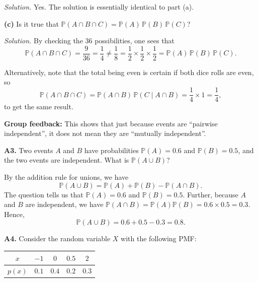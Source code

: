 \documentclass[
  a4paper,
]{book}
\theoremstyle{definition}
\theoremstyle{definition}
\theoremstyle{definition}
\theoremstyle{definition}
\theoremstyle{remark}
\begin{document}
\begin{myanswers}
\emph{Solution.} Yes. The solution is essentially identical to part (a).

\end{myanswers}

\textbf{(c)} Is it true that \(\mathbb P(A \cap B \cap C) = \mathbb P(A) \, \mathbb P(B) \, \mathbb P(C)\)?

\begin{myanswers}
\emph{Solution.}
By checking the 36 possibilities, one sees that
\[ \mathbb P(A \cap B \cap C) = \frac{9}{36} = \frac{1}{4} \neq \frac{1}{8} = \frac12 \times \frac12 \times \frac12 = \mathbb P(A)\, \mathbb P(B) \, \mathbb P(C) . \]

Alternatively, note that the total being even is certain if both dice rolls are even, so
\[ \mathbb P(A \cap B \cap C) = \mathbb P(A \cap B) \, \mathbb P(C \mid A \cap B) = \frac14 \times 1 = \frac14 , \]
to get the same result.

\textbf{Group feedback:} This shows that just because events are ``pairwise independent'', it does not mean they are ``mutually independent''.

\end{myanswers}

\textbf{A3.} Two events \(A\) and \(B\) have probabilities \(\mathbb P(A) = 0.6\) and \(\mathbb P(B) = 0.5\), and the two events are independent. What is \(\mathbb P(A \cup B)\)?

\begin{myanswers}
By the addition rule for unions, we have
\[ \mathbb P(A \cup B) = \mathbb P(A) + \mathbb P(B) - \mathbb P(A \cap B) . \]
The question tells us that \(\mathbb P(A) = 0.6\) and \(\mathbb P(B) = 0.5\). Further, because \(A\) and \(B\) are independent, we have \(\mathbb P(A \cap B) = \mathbb P(A)\mathbb P(B) = 0.6 \times 0.5 = 0.3\). Hence,
\[ \mathbb P(A \cup B) = 0.6 + 0.5 - 0.3 = 0.8 . \]

\end{myanswers}

\textbf{A4.} Consider the random variable \(X\) with the following PMF:

\begin{longtable}[]{@{}ccccc@{}}
\toprule()
\(x\) & \(-1\) & \(0\) & \(0.5\) & \(2\) \\
\midrule()
\endhead
\(p(x)\) & \(0.1\) & \(0.4\) & \(0.2\) & \(0.3\) \\
\bottomrule()
\end{longtable}
\end{document}
